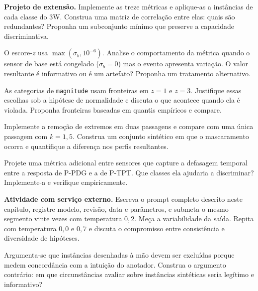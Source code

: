 \begin{exercicios}
\item \textbf{Projeto de extensão.} Implemente as treze métricas e aplique-as a
      instâncias de cada classe do 3W.
      Construa uma matriz de correlação entre elas: quais são redundantes? Proponha um
      subconjunto mínimo que preserve a capacidade discriminativa.

\item O escore-$z$ usa $\max(\sigma_b, 10^{-6})$. Analise o comportamento da métrica
      quando o sensor de base está congelado ($\sigma_b = 0$) mas o evento apresenta
      variação. O valor resultante é informativo ou é um artefato? Proponha um
      tratamento alternativo.

\item As categorias de \texttt{magnitude} usam fronteiras em $z = 1$ e $z = 3$.
      Justifique essas escolhas sob a hipótese de normalidade e discuta o que acontece
      quando ela é violada. Proponha fronteiras baseadas em quantis empíricos e compare.

\item Implemente a remoção de extremos em duas passagens e compare com uma única passagem
      com $k = 1{,}5$. Construa um conjunto sintético em que o mascaramento ocorra e
      quantifique a diferença nos perfis resultantes.

\item Projete uma métrica adicional entre sensores que capture a defasagem temporal
      entre a resposta de P-PDG e a de P-TPT. Que classes ela ajudaria a discriminar?
      Implemente-a e verifique empiricamente.

\item \textbf{Atividade com serviço externo.} Escreva o prompt completo descrito neste
      capítulo, registre modelo, revisão, data e parâmetros, e submeta o mesmo segmento
      vinte vezes com temperatura $0{,}2$. Meça a variabilidade da saída. Repita com
      temperatura $0{,}0$ e $0{,}7$ e discuta o compromisso entre consistência e
      diversidade de hipóteses.

\item Argumenta-se que instâncias desenhadas à mão devem ser excluídas porque medem
      concordância com a intuição do anotador. Construa o argumento contrário: em que
      circunstâncias avaliar sobre instâncias sintéticas seria legítimo e informativo?
\end{exercicios}

